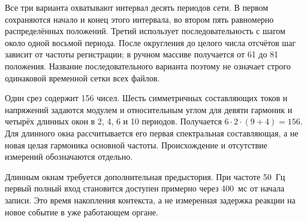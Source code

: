 Все три варианта охватывают интервал десять периодов сети.
В первом сохраняются начало и конец этого интервала,
во втором пять равномерно распределённых положений.
Третий использует последовательность с шагом около
одной восьмой периода. После округления до целого числа
отсчётов шаг зависит от частоты регистрации;
в ручном массиве получается от 61 до 81 положения.
Название последовательного варианта поэтому
не означает строго одинаковой временной сетки всех файлов.

Один срез содержит 156 чисел.
Шесть симметричных составляющих токов и напряжений
задаются модулем и относительным углом для девяти гармоник
и четырёх длинных окон в 2, 4, 6 и 10 периодов.
Получается $6\cdot2\cdot(9+4)=156$.
Для длинного окна рассчитывается его первая спектральная
составляющая, а не новая целая гармоника основной частоты.
Происхождение и отсутствие измерений обозначаются отдельно.

Длинным окнам требуется дополнительная предыстория.
При частоте 50~Гц первый полный вход становится доступен
примерно через 400~мс от начала записи.
Это время накопления контекста, а не измеренная
задержка реакции на новое событие в уже работающем органе.

\iffalse
\ifdefined\AuthorReview
\par\smallskip\begingroup\small\raggedright\color{red!60!black}
\noindent\textbf{Примечание рецензента [R5-05], связь с разработанной моделью.} В начале 5.8 назвать конкретную использованную физическую трансформерную модель и дать точную ссылку на её описание в главе 4, не повторяя его. Одних размеров 64/4/4/256 недостаточно, чтобы понять роль авторских физических и KAN-блоков. В статье отдельно оговорено циклическое представление углов; кратко сохранить этот существенный вариант входа. В двухголовой постановке также явно указать порог применимости 0,5 и правило получения направления. Историческую реализацию не заменять нынешним кодом.\par\endgroup\smallskip
\fi
\ifdefined\AuthorReview
\par{}\smallskip
\fi
\fi

{}

